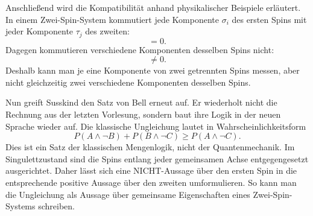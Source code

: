Anschließend wird die Kompatibilität anhand physikalischer Beispiele erläutert. In einem Zwei-Spin-System kommutiert jede Komponente \(\sigma_i\) des ersten Spins mit jeder Komponente \(\tau_j\) des zweiten:
\begin{equation}
[\sigma_i,\tau_j]=0.
\end{equation}
Dagegen kommutieren verschiedene Komponenten desselben Spins nicht:
\begin{equation}
[\sigma_1,\sigma_3]\neq 0.
\end{equation}
Deshalb kann man je eine Komponente von zwei getrennten Spins messen, aber nicht gleichzeitig zwei verschiedene Komponenten desselben Spins.

\begin{classroomqa}\end{classroomqa}

\begin{classroomqa}\end{classroomqa}

\begin{classroomqa}\end{classroomqa}

Nun greift Susskind den Satz von Bell erneut auf. Er wiederholt nicht die Rechnung aus der letzten Vorlesung, sondern baut ihre Logik in der neuen Sprache wieder auf. Die klassische Ungleichung lautet in Wahrscheinlichkeitsform
\begin{equation}
P(A\wedge \neg B)+P(B\wedge \neg C)\ge P(A\wedge \neg C).
\end{equation}
Dies ist ein Satz der klassischen Mengenlogik, nicht der Quantenmechanik. Im Singulettzustand sind die Spins entlang jeder gemeinsamen Achse entgegengesetzt ausgerichtet. Daher lässt sich eine NICHT-Aussage über den ersten Spin in die entsprechende positive Aussage über den zweiten umformulieren. So kann man die Ungleichung als Aussage über gemeinsame Eigenschaften eines Zwei-Spin-Systems schreiben.

